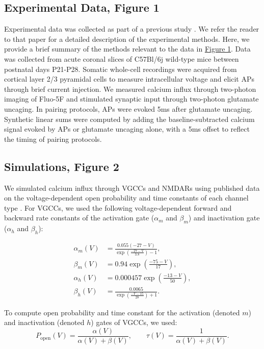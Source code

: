 \subsection*{Experimental Data, Figure 1}
Experimental data was collected as part of a previous study \citep{landauDendriticBranchStructure2022}. We refer the reader to that paper for a detailed description of the experimental methods. Here, we provide a brief summary of the methods relevant to the data in \hyperref[fig:1]{Figure 1}. Data was collected from acute coronal slices of C57Bl/6j wild-type mice between postnatal days P21-P28. Somatic whole-cell recordings were acquired from cortical layer 2/3 pyramidal cells to measure intracellular voltage and elicit APs through brief current injection. We measured calcium influx through two-photon imaging of Fluo-5F and stimulated synaptic input through two-photon glutamate uncaging. In pairing protocols, APs were evoked 5ms after glutamate uncaging. Synthetic linear sums were computed by adding the baseline-subtracted calcium signal evoked by APs or glutamate uncaging alone, with a 5ms offset to reflect the timing of pairing protocols.

\subsection*{Simulations, Figure 2}
We simulated calcium influx through VGCCs and NMDARs using published data on the voltage-dependent open probability and time constants of each channel type \citep{jahrVoltageDependenceNMDAactivated1990, reuveniStepwiseRepolarizationCa21993}. For VGCCs, we used the following voltage-dependent forward and backward rate constants of the activation gate ($\alpha_m$ and $\beta_m$) and inactivation gate ($\alpha_h$ and $\beta_h$):

\begin{align*}
\alpha_m(V) &= \frac{0.055(-27 - V)}{\exp\!\left(\frac{-27 - V}{3.8}\right) - 1}, \\
\beta_m(V) &= 0.94\exp\!\left(\frac{-75 - V}{17}\right), \\
\alpha_h(V) &= 0.000457\exp\!\left(\frac{-13 - V}{50}\right), \\
\beta_h(V) &= \frac{0.0065}{\exp\!\left(\frac{-V - 15}{28}\right) + 1}.
\end{align*}

To compute open probability and time constant for the activation (denoted $m$) and inactivation (denoted $h$) gates of VGCCs, we used:
\begin{equation*}
P_{\mathrm{open}}(V) = \frac{\alpha(V)}{\alpha(V) + \beta(V)}, \qquad
\tau(V) = \frac{1}{\alpha(V) + \beta(V)}.
\end{equation*}


